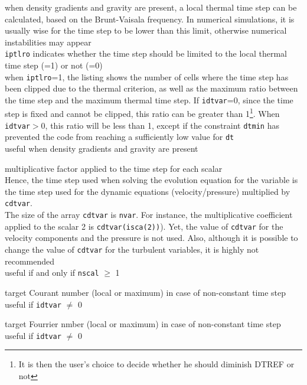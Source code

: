 {when density gradients and gravity are present, a local thermal time
step can be calculated, based on the Brunt-Vaisala frequency. In numerical
simulations, it is usually wise for the time step to be lower than this limit,
otherwise numerical instabilities may appear\\
{\tt iptlro} indicates whether the time step should be limited to the local thermal
time step (=1) or not (=0)\\
when {\tt iptlro}=1, the listing shows the number of cells where the time step has
been clipped due to the thermal criterion, as well as the maximum ratio between
the time step and the maximum thermal time step. If {\tt idtvar}=0, since the time
step is fixed and cannot be clipped, this ratio can be greater than
1\footnote{It is then the user's
choice to decide whether he should diminish DTREF or not}. When {\tt idtvar}$>$0, this
ratio will be less than 1, except if the constraint {\tt dtmin} has prevented the
code from reaching a sufficiently low value for {\tt dt}\\
useful when density gradients and gravity are present}

{multiplicative factor applied to the time step for each scalar\\
Hence, the time step used when solving the evolution equation for the
variable is the time step used for the dynamic equations (velocity/pressure)
multiplied by {\tt cdtvar}.\\
The size of the array {\tt cdtvar} is {\tt nvar}. For instance, the multiplicative
coefficient applied to the scalar 2 is {\tt cdtvar(isca(2))}). Yet, the value of
{\tt cdtvar} for the velocity components and the pressure is not used. Also,
although it is possible to change the value of {\tt cdtvar} for the turbulent
variables, it is highly not recommended\\
useful if and only if {\tt nscal} $\geqslant$ 1}


{target Courant number (local or maximum) in case of non-constant time step\\
useful if {\tt idtvar} $\ne$ 0}

{target Fourrier nmber (local or maximum) in case of non-constant time step\\
useful if {\tt idtvar} $\ne$ 0}

